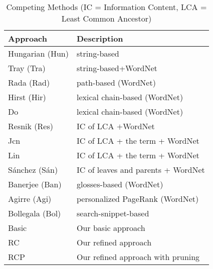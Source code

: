 \begin{table}[th]
\centering
\caption{Competing Methods (IC = Information Content, LCA = Least Common Ancestor)}
\label{tab:allmethods}
\small{
\begin{tabular}{|l|l|}\hline
{\bf Approach} & {\bf Description} \\\hline\hline
Hungarian (Hun) \cite{hungarian:string} 	&string-based\\\hline
Tray (Tra)\cite{tray:2005} &string-based+WordNet \\ \hline
Rada (Rad) \cite{Rada:1989} &path-based (WordNet) \\\hline
Hirst (Hir) \cite{Hirst:1998}	&lexical chain-based (WordNet) \\\hline
Do \cite{Do:DRSTV09}	&lexical chain-based (WordNet) \\\hline
Resnik (Res)\cite{Resnik:1995}	& IC of LCA $+$WordNet \\\hline
Jcn \cite{Jiang:1997}	& IC of LCA + the term + WordNet \\\hline
Lin \cite{Lin:1998}	& IC of LCA + the term + WordNet\\\hline
S\'{a}nchez (S\'{a}n)\cite{Snchez:2011}	& IC of leaves and parents + WordNet \\\hline
Banerjee (Ban)\cite{Banerjee:2002}	& glosses-based (WordNet) \\\hline
Agirre (Agi)\cite{Agirre:2010}	& personalized PageRank (WordNet)\\\hline
Bollegala (Bol)\cite{Bollegala:2011} &search-snippet-based	\\\hline
Basic & Our basic approach\\\hline
RC & Our refined approach \\\hline
RCP & Our refined approach with pruning \\\hline
\end{tabular}
}
\end{table}

